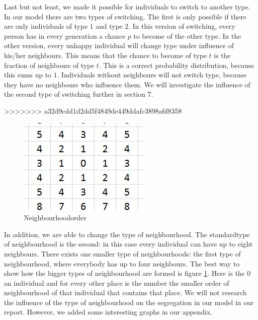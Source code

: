 Last but not least, we made it possible for individuals to switch to another type.
In our model there are two types of switching.
The first is only possible if there are only individuals of type $1$ and type $2$.
In this version of switching, every person has in every generation a chance $p$ to become of the other type.
In the other version, every unhappy individual will change type under influence of his/her neighbours.
This means that the chance to become of type $t$ is the fraction of neighbours of type $t$.
This is a correct probability distribution, because this sums up to $1$.
Individuals without neighbours will not switch type, because they have no neighbours who influence them.
We will investigate the influence of the second type of switching further in section $7$.





 

>>>>>>> a32d9cdd1d2dd5f4849de449ddafc3898a6f8358

\begin{figure}
\vspace{-20pt}
\centering
\includegraphics[scale=0.5]{buurtorde.jpg}
\caption{Neighbourhoodorder}
\vspace{-15pt}
\label{fig:neighbourhood}
\end{figure}

In addition, we are able to change the type of neighbourhood.
The standardtype of neighbourhood is the second: in this case every individual can have up to eight neighbours.
There exists one smaller type of neighbourhoods: the first type of neighbourhood, where everybody has up to four neighbours.
The best way to show how the bigger types of neighbourhood are formed is figure \ref{fig:neighbourhood}.
Here is the $0$ an individual and for every other place is the number the smaller order of neighbourhood of that individual that contains that place.
We will not research the influence of the type of neighbourhood on the segregation in our model in our report.
However, we added some interesting graphs in our appendix.\\

